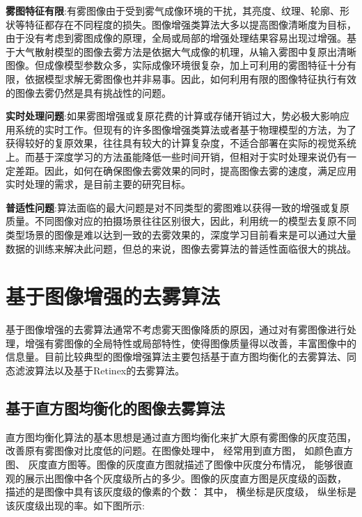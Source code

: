 \documentclass[12pt]{article}
\begin{document}
\textbf{雾图特征有限}:有雾图像由于受到雾气成像环境的干扰，其亮度、纹理、轮廓、形状等特征都存在不同程度的损失。图像增强类算法大多以提高图像清晰度为目标，由于没有考虑到雾图成像的原理，全局或局部的增强处理结果容易出现过增强。基于大气散射模型的图像去雾方法是依据大气成像的机理，从输入雾图中复原出清晰图像。但成像模型参数众多，实际成像环境很复杂，加上可利用的雾图特征十分有限，依据模型求解无雾图像也并非易事。因此，如何利用有限的图像特征执行有效的图像去雾仍然是具有挑战性的问题。

\textbf{实时处理问题}:如果雾图增强或复原花费的计算或存储开销过大，势必极大影响应用系统的实时工作。但现有的许多图像增强类算法或者基于物理模型的方法，为了获得较好的复原效果，往往具有较大的计算复杂度，不适合部署在实际的视觉系统上。而基于深度学习的方法虽能降低一些时间开销，但相对于实时处理来说仍有一定差距。因此，如何在确保图像去雾效果的同时，提高图像去雾的速度，满足应用实时处理的需求，是目前主要的研究目标。

\textbf{普适性问题}:算法面临的最大问题是对不同类型的雾图难以获得一致的增强或复原质量。不同图像对应的拍摄场景往往区别很大，因此，利用统一的模型去复原不同类型场景的图像是难以达到一致的去雾效果的，深度学习目前看来是可以通过大量数据的训练来解决此问题，但总的来说，图像去雾算法的普适性面临很大的挑战。

\section{基于图像增强的去雾算法}

基于图像增强的去雾算法通常不考虑雾天图像降质的原因，通过对有雾图像进行处理，增强有雾图像的全局特性或局部特性，使得图像质量得以改善，丰富图像中的信息量。目前比较典型的图像增强算法主要包括基于直方图均衡化的去雾算法、同态滤波算法以及基于Retinex的去雾算法。

\subsection{基于直方图均衡化的图像去雾算法}

直方图均衡化算法的基本思想是通过直方图均衡化来扩大原有雾图像的灰度范围，改善原有雾图像对比度低的问题。在图像处理中， 经常用到直方图， 如颜色直方图、 灰度直方图等。图像的灰度直方图就描述了图像中灰度分布情况， 能够很直观的展示出图像中各个灰度级所占的多少。图像的灰度直方图是灰度级的函数， 描述的是图像中具有该灰度级的像素的个数： 其中， 横坐标是灰度级， 纵坐标是该灰度级出现的率。如下图所示:
\end{document}
